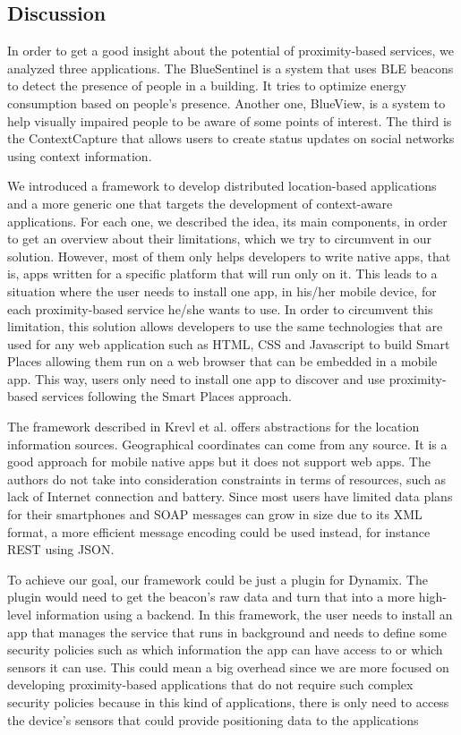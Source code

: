\subsection{Discussion}
\label{sub:solution_related_work_discussion}
In order to get a good insight about the potential of proximity-based services, we analyzed three applications.
The BlueSentinel is a system that uses \gls{BLE} beacons to detect the presence of people in a building. It tries to optimize energy consumption based on people's presence.
Another one, BlueView, is a system to help visually impaired people to be aware of some points of interest.
The third is the ContextCapture that allows users to create status updates on social networks using context information.

We introduced a framework to develop distributed location-based applications and a more generic one that targets the development of context-aware applications.
For each one, we described the idea, its main components, in order to get an overview about their limitations, which we try to circumvent in our solution.
However, most of them only helps developers to write native apps, that is, apps written for a specific platform that will run only on it.
This leads to a situation where the user needs to install one app, in his/her mobile device, for each proximity-based service he/she wants to use.
In order to circumvent this limitation, this solution allows developers
to use the same technologies that are used for any web application such as \gls{HTML}, \gls{CSS} and Javascript to build Smart Places allowing them run on a web browser that can be embedded in a mobile app. This way, users only need to install one app to discover and use proximity-based services following the Smart Places approach.

The framework described in Krevl et al.\cite{Krevl2006} offers abstractions for the location information sources.
Geographical coordinates can
come from any source.
It is a good approach for
mobile native apps but it does not support web apps.
The authors do not take into consideration
constraints in terms of resources, such as
lack of Internet connection and battery.
Since most users have limited data plans for
their smartphones and \gls{SOAP} messages can
grow in size due to its \gls{XML} format,
a more efficient message encoding could be used
instead, for instance \gls{REST} using \gls{JSON}.

To achieve our goal, our framework could be just a
plugin for Dynamix. The plugin would
need to get the beacon's raw data and
turn that into a more high-level information
using a backend. In this framework,
the user needs to install an app that manages the service
that runs in background and needs to define some
security policies such as which information the app can have access to or which sensors it can use.
This could mean a big overhead since we are more focused on developing proximity-based applications that do not require such complex security policies because in this kind of applications, there is only need to access the device's sensors that could provide positioning data to the applications

